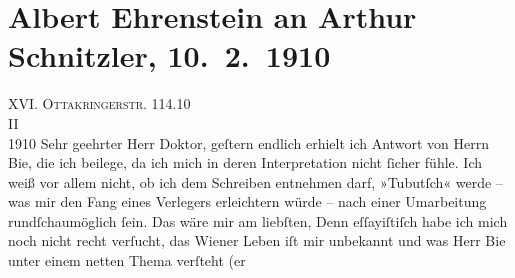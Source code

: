 

         
         \newcommand{\erwaehntePersonen}{Personen: Oskar Bie, Janina Borowska, Adolf Hofrichter,  Homer, Rudolf Alexander Schröder}
         \newcommand{\erwaehnteInstitutionen}{Institutionen: Insel-Verlag}
         \newcommand{\erwaehnteOrte}{Orte: Burgtheater, Krakau, Ottakringerstraße, Volkstheater, Wien}
         \newcommand{\erwaehnteWerke}{Werke: Der junge Medardus. Dramatische Historie in einem Vorspiel und fünf Aufzügen, Die neue Rundschau, Odyssee, Tubutsch}
               \section[Albert Ehrenstein an Arthur Schnitzler, 10. 2. 1910]{ Albert Ehrenstein an Arthur Schnitzler, 10. 2. 1910}\nopagebreak{}\rehead{ }\begin{ledgroupsized}[t]{13cm}\normalsize\beginnumbering \toendnotes[C]{\smallbreak\pagebreak[2]} 
\toendnotes[C]{\smallbreak}\pstart
           {\pb}XVI. \textsc{Ottakringerstr.} 114.\hfill 10{\\}II{\\}1910\pend
           \pstart{}Sehr geehrter Herr Doktor,\pend\pstart
           geſtern endlich erhielt ich Antwort von Herrn Bie, die ich beilege, da ich mich in deren Interpretation nicht ſicher
                    fühle. Ich weiß vor allem nicht, ob ich dem Schreiben entnehmen darf, »Tubutſch« werde – was mir den Fang eines
                    Verlegers erleichtern würde – nach einer Umarbeitung rundſchaumöglich ſein. Das wäre mir am liebſten, Denn
                    eſſayiſtiſch habe ich mich noch nicht recht verſucht, das Wiener Leben iſt mir unbekannt und was Herr Bie unter einem netten Thema verſteht (er

\end{ledgroupsized}
